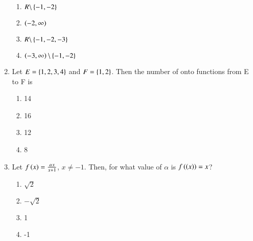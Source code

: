 \documentclass[journal,12pt,twocolumn]{IEEEtran}
\theoremstyle{remark}
\begin{document}
\begin{enumerate}
\hfill{}

\begin{multicols}{2}
	\begin{enumerate}
		\item $R \backslash \left\{-1,-2\right\}$ 
		\item $\left(-2,\infty\right)$
		\item $R \backslash \left\{-1,-2,-3\right\}$ 
		\item $\left(-3,\infty\right)\backslash\left\{-1,-2\right\}$
	\end{enumerate}
\end{multicols}
                                                                                        
\item Let $E=\left\{1,2,3,4\right\}$ and $F=\left\{1,2\right\}$. Then the number of onto functions from E to F is

\hfill{}

\begin{multicols}{4}
	\begin{enumerate}
		\item 14 
		\item 16 
		\item 12 
		\item 8
	\end{enumerate}
\end{multicols}

\item Let $f\left(x\right)=\frac{\alpha x}{x+1}$, $x\neq-1$. Then, for what value of $\alpha$ is $f\left(\left(x\right)\right)=x$?

\hfill{}

\begin{multicols}{4}
	\begin{enumerate}
		\item $\sqrt{2}$ 
		\item $-\sqrt{2}$ 
		\item 1 
		\item -1
	\end{enumerate}
\end{multicols}

\end{enumerate}
\end{document}
